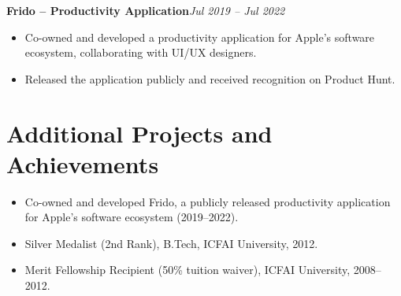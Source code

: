 \documentclass[10pt,a4paper]{article}
\newcommand{\project}[2]{
    \textbf{#1}\hfill\textit{#2}
    \par
}
\begin{document}
\project
    {Frido -- Productivity Application}
    {Jul 2019 -- Jul 2022}

\begin{itemize}
    \item Co-owned and developed a productivity
    application for Apple's software ecosystem,
    collaborating with UI/UX designers.

    \item Released the application publicly
    and received recognition on Product Hunt.
\end{itemize}

\section*{Additional Projects and Achievements}

\begin{itemize}
    \item Co-owned and developed Frido,
    a publicly released productivity
    application for Apple's software ecosystem
    (2019--2022).

    \item Silver Medalist (2nd Rank),
    B.Tech, ICFAI University, 2012.

    \item Merit Fellowship Recipient
    (50\% tuition waiver),
    ICFAI University, 2008--2012.
\end{itemize}
\end{document}
